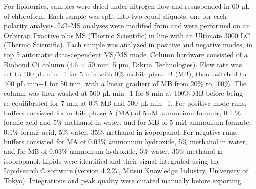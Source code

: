 For lipidomics, samples were dried under nitrogen flow and resuspended in 60 µL of chloroform. Each sample was split into two equal aliquots, one for each polarity analysis. LC–MS analyses were modified from \cite{Miraldi2013-go} and were performed on an Orbitrap Exactive plus MS (Thermo Scientific) in line with an Ultimate 3000 LC (Thermo Scientific). Each sample was analyzed in positive and negative modes, in top 5 automatic data-dependent MS/MS mode. Column hardware consisted of a Biobond C4 column (4.6 × 50 mm, 5 μm, Dikma Technologies). Flow rate was set to 100 µL min−1 for 5 min with 0\% mobile phase B (MB), then switched to 400 µL min−1 for 50 min, with a linear gradient of MB from 20\% to 100\%. The column was then washed at 500 µL min−1 for 8 min at 100\% MB before being re-equilibrated for 7 min at 0\% MB and 500 µL min−1. For positive mode runs, buffers consisted for mobile phase A (MA) of 5mM ammonium formate, 0.1 \% formic acid and 5\% methanol in water, and for MB of 5 mM ammonium formate, 0.1\% formic acid, 5\% water, 35\% methanol in isopropanol. For negative runs, buffers consisted for MA of 0.03\% ammonium hydroxide, 5\% methanol in water, and for MB of 0.03\% ammonium hydroxide, 5\% water, 35\% methanol in isopropanol. Lipids were identified and their signal integrated using the Lipidsearch © software (version 4.2.27, Mitsui Knowledge Industry, University of Tokyo). Integrations and peak quality were curated manually before exporting. 
